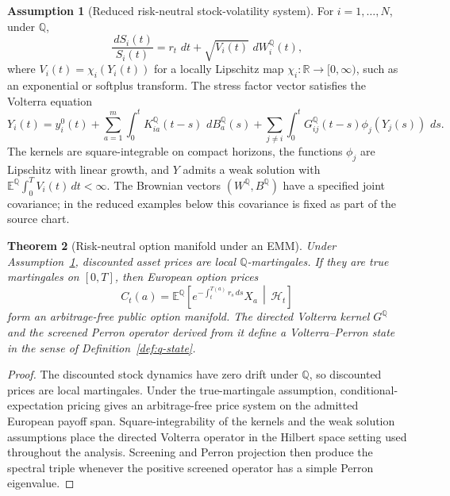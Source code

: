 \documentclass[11pt,a4paper]{amsart}
\theoremstyle{plain}
\newtheorem{theorem}{Theorem}[section]
\theoremstyle{definition}
\newtheorem{assumption}[theorem]{Assumption}
\theoremstyle{remark}
\newcommand{\R}{\mathbb{R}}
\newcommand{\QQ}{\mathbb{Q}}
\newcommand{\EE}{\mathbb{E}}
\newcommand{\cH}{\mathcal{H}}
\newcommand{\dd}{\,d}
\begin{document}
\begin{assumption}[Reduced risk-neutral stock-volatility system]\label{ass:emm}
For \(i=1,\dots,N\), under \(\QQ\),
\[
        \frac{\dd S_i(t)}{S_i(t)}
        =
        r_t\,\dd t+\sqrt{V_i(t)}\,\dd W_i^\QQ(t),
\]
where \(V_i(t)=\chi_i(Y_i(t))\) for a locally Lipschitz map
\(\chi_i:\R\to[0,\infty)\), such as an exponential or softplus transform.  The stress factor
vector satisfies the Volterra equation
\[
        Y_i(t)
        =
        y_i^0(t)
        +
        \sum_{a=1}^m\int_0^t K_{ia}^\QQ(t-s)\,\dd B_a^\QQ(s)
        +
        \sum_{j\ne i}\int_0^t G_{ij}^\QQ(t-s)\phi_j(Y_j(s))\,\dd s.
\]
The kernels are square-integrable on compact horizons, the functions \(\phi_j\) are Lipschitz
with linear growth, and \(Y\) admits a weak solution with
\(\EE^\QQ\int_0^T V_i(t)\dd t<\infty\).  The Brownian vectors \((W^\QQ,B^\QQ)\) have a specified
joint covariance; in the reduced examples below this covariance is fixed as part of the source
chart.
\end{assumption}

\begin{theorem}[Risk-neutral option manifold under an EMM]\label{thm:emm-specialization}
Under Assumption~\ref{ass:emm}, discounted asset prices are local \(\QQ\)-martingales.  If they
are true martingales on \([0,T]\), then European option prices
\[
        C_t(a)
        =
        \EE^\QQ\!\left[
        e^{-\int_t^{T(a)}r_s\dd s}X_a
        \,\middle|\,\cH_t
        \right]
\]
form an arbitrage-free public option manifold.  The directed Volterra kernel \(G^\QQ\) and the
screened Perron operator derived from it define a Volterra--Perron state in the sense of
Definition~\ref{def:q-state}.
\end{theorem}

\begin{proof}
The discounted stock dynamics have zero drift under \(\QQ\), so discounted prices are local
martingales.  Under the true-martingale assumption, conditional-expectation pricing gives an
arbitrage-free price system on the admitted European payoff span.  Square-integrability of the
kernels and the weak solution assumptions place the directed Volterra operator in the Hilbert
space setting used throughout the analysis.  Screening and Perron projection then produce the spectral triple
whenever the positive screened operator has a simple Perron eigenvalue.
\end{proof}
\end{document}
